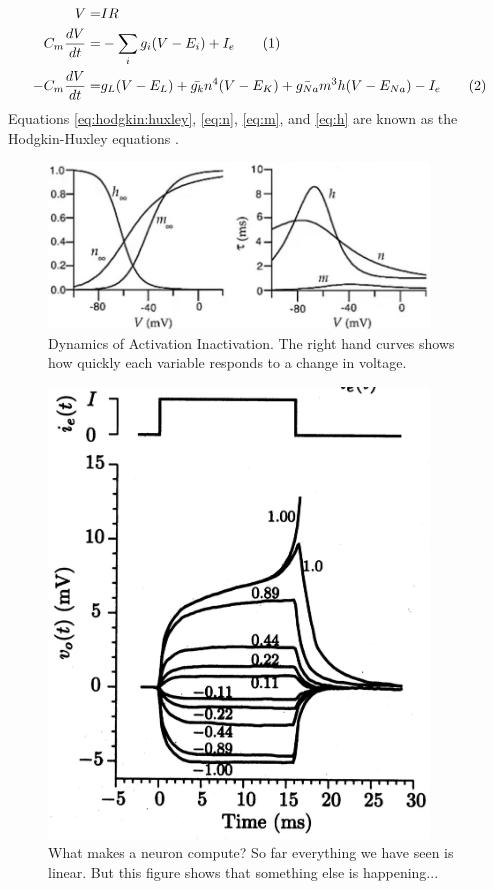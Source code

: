 \documentclass[]{article}
\newcommand\numberthis{\addtocounter{equation}{1}\tag{\theequation}}
\begin{document}
\begin{align*}
	V =& IR\\
	C_m\frac{dV}{dt}=&-\sum_{i}g_i(V-E_i) + I_e\numberthis\label{eq:hodgkin:huxley:precursor}\\
	-C_m\frac{dV}{dt}=&g_L(V-E_L)+\bar{g_k}n^4(V-E_K)+\bar{g_{Na}}m^3h(V-E_{Na})-I_e\numberthis\label{eq:hodgkin:huxley}
\end{align*}
Equations \eqref{eq:hodgkin:huxley}, \eqref{eq:n}, \eqref{eq:m}, and \eqref{eq:h} are known as the Hodgkin-Huxley equations \cite{hodgkin1952currents}.

\begin{figure}[H]
	\caption[Dynamics of Activation Inactivation]{Dynamics of Activation Inactivation. The right hand curves shows how quickly each variable responds to a change in voltage.}
	\includegraphics[width=0.9\textwidth]{dynamics-activation-inactivation}
\end{figure}

\begin{figure}[H]
	\caption[What makes a neuron compute?]{What makes a neuron compute? So far everything we have seen is linear. But this figure shows that something else is happening...}
	\includegraphics[width=0.9\textwidth]{what-makes-neuron-compute}
\end{figure}
\end{document}
